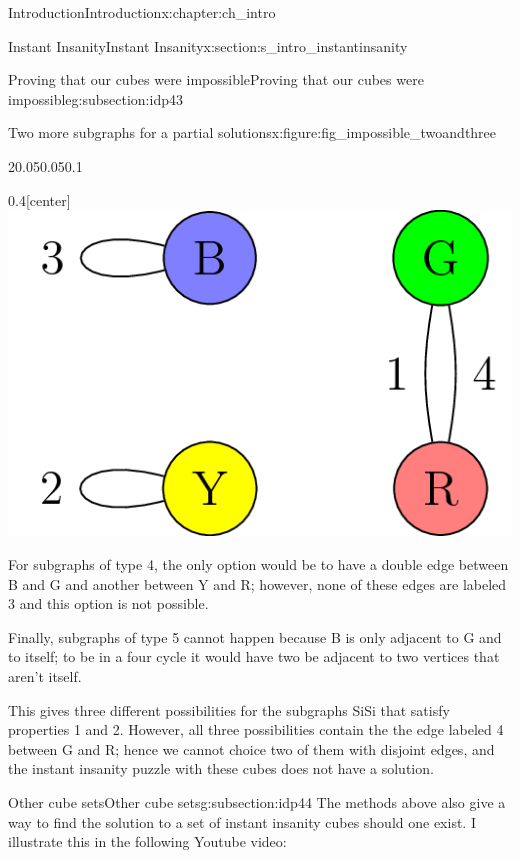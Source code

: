 \documentclass[oneside,10pt,]{book}
\numberwithin{equation}{section}
\newlength{\qrsize}
\newlength{\previewwidth}
\begin{document}
\begin{chapterptx}{Introduction}{}{Introduction}{}{}{x:chapter:ch_intro}
\begin{sectionptx}{Instant Insanity}{}{Instant Insanity}{}{}{x:section:s_intro_instantinsanity}
\begin{subsectionptx}{Proving that our cubes were impossible}{}{Proving that our cubes were impossible}{}{}{g:subsection:idp43}
\begin{figureptx}{Two more subgraphs for a partial solutions}{x:figure:fig_impossible_twoandthree}{}
\begin{sidebyside}{2}{0.05}{0.05}{0.1}
\begin{sbspanel}{0.4}[center]%
\includegraphics[width=\linewidth]{images/InstantInsanityImpossibleThird.png}
\end{sbspanel}%
\end{sidebyside}%
\tcblower
\end{figureptx}%
For subgraphs of type 4, the only option would be to have a double edge between B and G and another between Y and R; however, none of these edges are labeled 3 and this option is not possible.%
\par
Finally, subgraphs of type 5 cannot happen because B is only adjacent to G and to itself; to be in a four cycle it would have two be adjacent to two vertices that aren’t itself.%
\par
This gives three different possibilities for the subgraphs SiSi that satisfy properties 1 and 2. However, all three possibilities contain the the edge labeled 4 between G and R; hence we cannot choice two of them with disjoint edges, and the instant insanity puzzle with these cubes does not have a solution.%
\end{subsectionptx}
%
%
\typeout{************************************************}
\typeout{************************************************}
%
\begin{subsectionptx}{Other cube sets}{}{Other cube sets}{}{}{g:subsection:idp44}
The methods above also give a way to find the solution to a set of instant insanity cubes should one exist.  I illustrate this in the following Youtube video:%
\setlength{\qrsize}{9em}
\setlength{\previewwidth}{\linewidth}
\addtolength{\previewwidth}{-\qrsize}
\begin{tcbraster}[raster columns=2, raster column skip=1pt, raster halign=center, raster force size=false, raster left skip=0pt, raster right skip=0pt]%

\end{tcbraster}
\end{subsectionptx}
\end{sectionptx}
\end{chapterptx}
\end{document}
